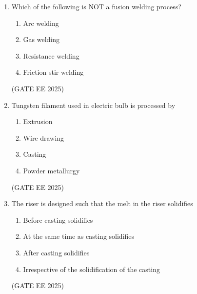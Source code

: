 \documentclass[11pt, letterpaper]{article}
\theoremstyle{remark}
\begin{document}
\begin{enumerate}
\begin{multicols}{2}
\begin{enumerate}  
\item \( E_c = (1-f)E_m + f E_f \)
\item \( E_c = fE_m + (1-f)E_f \)
\item \( \frac{1}{E_c} = \frac{(1-f)}{E_m} + \frac{f}{E_f} \)
\item \( \frac{1}{E_c} = \frac{f}{E_m} + \frac{(1-f)}{E_f} \)
\end{enumerate}
\end{multicols}
\hfill(GATE EE 2025)

\item Which of the following is NOT a fusion welding process?

\begin{multicols}{2}
\begin{enumerate}  
\item Arc welding
\item Gas welding
\item Resistance welding
\item Friction stir welding
\end{enumerate}
\end{multicols}
\hfill(GATE EE 2025)

\item Tungsten filament used in electric bulb is processed by

\begin{multicols}{2}
\begin{enumerate}  
\item Extrusion
\item Wire drawing
\item Casting
\item Powder metallurgy
\end{enumerate}
\end{multicols}
\hfill(GATE EE 2025)

\item The riser is designed such that the melt in the riser solidifies

\begin{enumerate}  
\item Before casting solidifies
\item At the same time as casting solidifies
\item After casting solidifies
\item Irrespective of the solidification of the casting
\end{enumerate}
\hfill(GATE EE 2025)



\end{enumerate}
\end{document}
